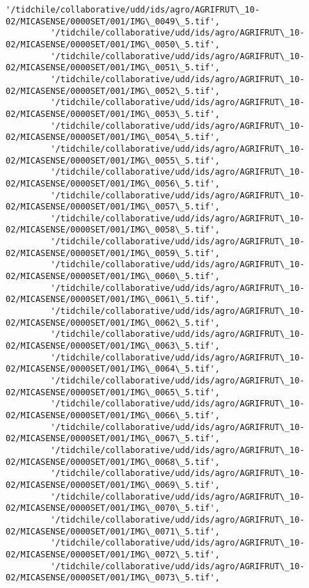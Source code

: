 \documentclass[11pt]{article}
\begin{document}
\begin{Verbatim}[commandchars=\\\{\}]
         '/tidchile/collaborative/udd/ids/agro/AGRIFRUT\_10-02/MICASENSE/0000SET/001/IMG\_0049\_5.tif',
         '/tidchile/collaborative/udd/ids/agro/AGRIFRUT\_10-02/MICASENSE/0000SET/001/IMG\_0050\_5.tif',
         '/tidchile/collaborative/udd/ids/agro/AGRIFRUT\_10-02/MICASENSE/0000SET/001/IMG\_0051\_5.tif',
         '/tidchile/collaborative/udd/ids/agro/AGRIFRUT\_10-02/MICASENSE/0000SET/001/IMG\_0052\_5.tif',
         '/tidchile/collaborative/udd/ids/agro/AGRIFRUT\_10-02/MICASENSE/0000SET/001/IMG\_0053\_5.tif',
         '/tidchile/collaborative/udd/ids/agro/AGRIFRUT\_10-02/MICASENSE/0000SET/001/IMG\_0054\_5.tif',
         '/tidchile/collaborative/udd/ids/agro/AGRIFRUT\_10-02/MICASENSE/0000SET/001/IMG\_0055\_5.tif',
         '/tidchile/collaborative/udd/ids/agro/AGRIFRUT\_10-02/MICASENSE/0000SET/001/IMG\_0056\_5.tif',
         '/tidchile/collaborative/udd/ids/agro/AGRIFRUT\_10-02/MICASENSE/0000SET/001/IMG\_0057\_5.tif',
         '/tidchile/collaborative/udd/ids/agro/AGRIFRUT\_10-02/MICASENSE/0000SET/001/IMG\_0058\_5.tif',
         '/tidchile/collaborative/udd/ids/agro/AGRIFRUT\_10-02/MICASENSE/0000SET/001/IMG\_0059\_5.tif',
         '/tidchile/collaborative/udd/ids/agro/AGRIFRUT\_10-02/MICASENSE/0000SET/001/IMG\_0060\_5.tif',
         '/tidchile/collaborative/udd/ids/agro/AGRIFRUT\_10-02/MICASENSE/0000SET/001/IMG\_0061\_5.tif',
         '/tidchile/collaborative/udd/ids/agro/AGRIFRUT\_10-02/MICASENSE/0000SET/001/IMG\_0062\_5.tif',
         '/tidchile/collaborative/udd/ids/agro/AGRIFRUT\_10-02/MICASENSE/0000SET/001/IMG\_0063\_5.tif',
         '/tidchile/collaborative/udd/ids/agro/AGRIFRUT\_10-02/MICASENSE/0000SET/001/IMG\_0064\_5.tif',
         '/tidchile/collaborative/udd/ids/agro/AGRIFRUT\_10-02/MICASENSE/0000SET/001/IMG\_0065\_5.tif',
         '/tidchile/collaborative/udd/ids/agro/AGRIFRUT\_10-02/MICASENSE/0000SET/001/IMG\_0066\_5.tif',
         '/tidchile/collaborative/udd/ids/agro/AGRIFRUT\_10-02/MICASENSE/0000SET/001/IMG\_0067\_5.tif',
         '/tidchile/collaborative/udd/ids/agro/AGRIFRUT\_10-02/MICASENSE/0000SET/001/IMG\_0068\_5.tif',
         '/tidchile/collaborative/udd/ids/agro/AGRIFRUT\_10-02/MICASENSE/0000SET/001/IMG\_0069\_5.tif',
         '/tidchile/collaborative/udd/ids/agro/AGRIFRUT\_10-02/MICASENSE/0000SET/001/IMG\_0070\_5.tif',
         '/tidchile/collaborative/udd/ids/agro/AGRIFRUT\_10-02/MICASENSE/0000SET/001/IMG\_0071\_5.tif',
         '/tidchile/collaborative/udd/ids/agro/AGRIFRUT\_10-02/MICASENSE/0000SET/001/IMG\_0072\_5.tif',
         '/tidchile/collaborative/udd/ids/agro/AGRIFRUT\_10-02/MICASENSE/0000SET/001/IMG\_0073\_5.tif',

\end{Verbatim}
\end{document}
